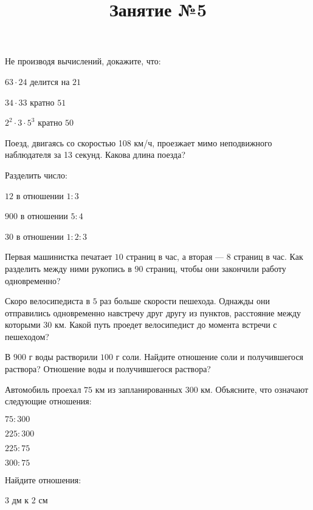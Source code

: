 \begin{listofex}
	\item Не производя вычислений, докажите, что:
	\begin{enumcols}[itemcolumns=2]
		\item \( 63\cdot24 \) делится на \( 21 \)
		\item \( 34\cdot33 \) кратно \( 51 \)
		\item \( 2^2\cdot3\cdot5^3 \) кратно \( 50 \)
	\end{enumcols}
	\item Поезд, двигаясь со скоростью 108 км/ч, проезжает мимо неподвижного наблюдателя за 13 секунд. Какова длина поезда?
\end{listofex}
\newpage
\title{Занятие №5}
\begin{listofex}
	\item Разделить число:
	\begin{enumcols}[itemcolumns=2]
		\item \( 12 \) в отношении \( 1:3 \)
		\item \( 900 \) в отношении \( 5:4 \)
		\item \( 30 \) в отношении \( 1:2:3 \)
	\end{enumcols}
	\item Первая машинистка печатает \( 10 \) страниц в час, а вторая --- \( 8 \) страниц в час. Как разделить между ними рукопись в \( 90 \) страниц, чтобы они закончили работу одновременно?
	\item Скоро велосипедиста в \( 5 \) раз больше скорости пешехода. Однажды они отправились одновременно навстречу друг другу из пунктов, расстояние между которыми \( 30 \) км. Какой путь проедет велосипедист до момента встречи с пешеходом?
	\item В \( 900 \) г воды растворили \( 100 \) г соли. Найдите отношение соли и получившегося раствора? Отношение воды и получившегося раствора?
	\item Автомобиль проехал \( 75 \) км из запланированных \( 300 \) км. Объясните, что означают следующие отношения:
	\begin{enumcols}[itemcolumns=4]
		\item \( 75:300 \)
		\item \( 225:300 \)
		\item \( 225:75 \)
		\item \( 300:75 \)
	\end{enumcols}
	\item Найдите отношения:
	\begin{enumcols}[itemcolumns=3]
		\item 3 дм к 2 см

\end{enumcols}
\end{listofex}
